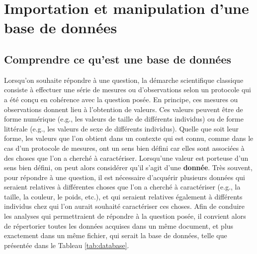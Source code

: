 \documentclass[
  french,
]{book}
\begin{document}
\hypertarget{importation-et-manipulation-dune-base-de-donnuxe9es}{%
\chapter{Importation et manipulation d'une base de données}\label{importation-et-manipulation-dune-base-de-donnuxe9es}}

\hypertarget{comprendre-ce-quest-une-base-de-donnuxe9es}{%
\section{Comprendre ce qu'est une base de données}\label{comprendre-ce-quest-une-base-de-donnuxe9es}}

Lorsqu'on souhaite répondre à une question, la démarche scientifique classique consiste à effectuer une série de mesures ou d'observations selon un protocole qui a été conçu en cohérence avec la question posée. En principe, ces mesures ou observations donnent lieu à l'obtention de valeurs. Ces valeurs peuvent être de forme numérique (e.g., les valeurs de taille de différents individus) ou de forme littérale (e.g., les valeurs de sexe de différents individus). Quelle que soit leur forme, les valeurs que l'on obtient dans un contexte qui est connu, comme dans le cas d'un protocole de mesures, ont un sens bien défini car elles sont associées à des choses que l'on a cherché à caractériser. Lorsqu'une valeur est porteuse d'un sens bien défini, on peut alors considérer qu'il s'agit d'une \textbf{donnée}.
Très souvent, pour répondre à une question, il est nécessaire d'acquérir plusieurs données qui seraient relatives à différentes choses que l'on a cherché à caractériser (e.g., la taille, la couleur, le poids, etc.), et qui seraient relatives également à différents individus chez qui l'on aurait souhaité caractériser ces choses. Afin de conduire les analyses qui permettraient de répondre à la question posée, il convient alors de répertorier toutes les données acquises dans un même document, et plus exactement dans un même fichier, qui serait la base de données, telle que présentée dans le Tableau \ref{tab:database}.

\providecommand{\docline}[3]{\noalign{\global\setlength{\arrayrulewidth}{#1}}\arrayrulecolor[HTML]{#2}\cline{#3}}

\setlength{\tabcolsep}{0pt}

\renewcommand*{\arraystretch}{1.5}
\end{document}
